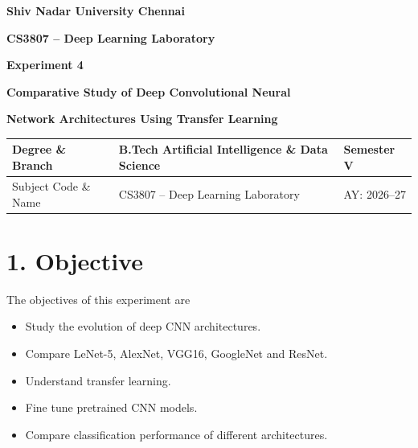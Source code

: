 \documentclass[11pt]{article}
\begin{document}
\begin{center}

{\Large\textbf{Shiv Nadar University Chennai}}

\vspace{3mm}

{\large\textbf{CS3807 -- Deep Learning Laboratory}}

\vspace{3mm}

{\Large\textbf{Experiment 4}}

\vspace{2mm}

{\Large\textbf{Comparative Study of Deep Convolutional Neural}}

{\Large\textbf{Network Architectures Using Transfer Learning}}

\end{center}

\vspace{5mm}

\begin{tabular}{|p{4cm}|p{8cm}|p{2cm}|}
\hline
Degree \& Branch &
B.Tech Artificial Intelligence \& Data Science &
Semester V\\
\hline
Subject Code \& Name &
CS3807 -- Deep Learning Laboratory &
AY: 2026--27\\
\hline
\end{tabular}

\section*{1. Objective}

The objectives of this experiment are

\begin{itemize}

\item Study the evolution of deep CNN architectures.

\item Compare LeNet-5, AlexNet, VGG16, GoogleNet and ResNet.

\item Understand transfer learning.

\item Fine tune pretrained CNN models.

\item Compare classification performance of different architectures.

\end{itemize}
\end{document}
